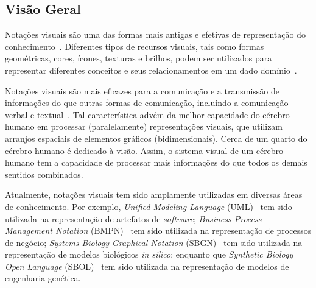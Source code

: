 \subsection{Visão Geral}\label{2-fundamentacao-notacao-visual-visao-geral}

Notações visuais são uma das formas mais antigas e efetivas de representação do conhecimento~\cite{DAVIES-1990-Egyptian-Hieroglyphs, MATHEWS-Classic-1991-Maya_Emblem_Glyphs, KAMESWARA-2005-Prehistoric-Astronomy-India}. Diferentes tipos de recursos visuais, tais como formas geométricas, cores, ícones, texturas e brilhos, podem ser utilizados para representar diferentes conceitos e seus relacionamentos em um dado domínio~\cite{SMITH-MORIARTY-KENNEY-BARBATSIS-2004-Handbook-Visual-Communication, MOODY-2009-Physics-Notation}.

Notações visuais são mais eficazes para a comunicação e a transmissão de informações do que outras formas de comunicação, incluindo a comunicação verbal e textual~\cite{MOODY-2009-Physics-Notation}. Tal característica advém da melhor capacidade do cérebro humano em processar (paralelamente) representações visuais, que utilizam arranjos espaciais de elementos gráficos (bidimensionais). Cerca de um quarto do cérebro humano é dedicado à visão. Assim, o sistema visual de um cérebro humano tem a capacidade de processar mais informações do que todos os demais sentidos combinados.



Atualmente, notações visuais tem sido amplamente utilizadas em diversas áreas de conhecimento. Por exemplo, \textit{Unified Modeling Language} (UML)~\cite{OMG-2017-UML} tem sido utilizada na representação de artefatos de \textit{software}; \textit{Business Process Management Notation} (BMPN)~\cite{OMG-2011-BPMN} tem sido utilizada na representação de processos de negócio; \textit{Systems Biology Graphical Notation} (SBGN)~\cite{NOVERE-BUCKA-MI-MOODIE-SCHREIBER-SOROKIN-2009-SBGN, VASUNDRA-LENOVERE-WALTEMATH-WOLKENHAUER-2018-SBGN} tem sido utilizada na representação de modelos biológicos \textit{in silico}; enquanto que \textit{Synthetic Biology Open Language} (SBOL)~\cite{QUINN-COX-ADLER-2015-SBOL} tem sido utilizada na representação de modelos de engenharia genética.